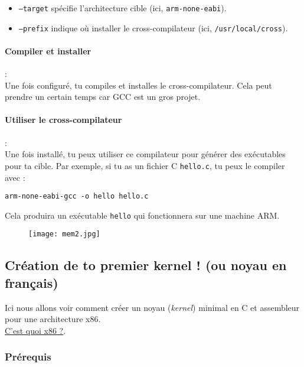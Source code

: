 \documentclass{article}
\begin{document}
\begin{itemize}
    \item \texttt{--target} spécifie l'architecture cible (ici, \texttt{arm-none-eabi}).
    \item \texttt{--prefix} indique où installer le cross-compilateur (ici, \texttt{/usr/local/cross}).
\end{itemize}

\paragraph{Compiler et installer}
:\\Une fois configuré, tu compiles et installes le cross-compilateur. Cela peut prendre un certain temps car GCC est un gros projet.

\paragraph{Utiliser le cross-compilateur}
:\\Une fois installé, tu peux utiliser ce compilateur pour générer des exécutables pour ta cible. Par exemple, si tu as un fichier C \texttt{hello.c}, tu peux le compiler avec :

\begin{lstlisting}
arm-none-eabi-gcc -o hello hello.c
\end{lstlisting}

Cela produira un exécutable \texttt{hello} qui fonctionnera sur une machine ARM.

\begin{figure}[h!]
    \centering
    \texttt{[image: mem2.jpg]}
    \label{fig:logo2}
\end{figure}



\subsection*{Création de to premier kernel ! (ou noyau en français)}
Ici nous allons voir comment créer un noyau (\textit{kernel}) minimal en C et assembleur pour une architecture x86. \\ \hyperref[fig:x86]{C'est quoi x86 ?}.
\subsubsection*{Prérequis}
\end{document}
